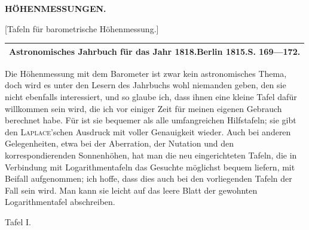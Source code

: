 \par\clearpage
\noindent{}\hfill{\small\textbf{HÖHENMESSUNGEN.}}\hfill\null\par\medskip
\vspace*{.23\textheight}
\begin{center}
[Tafeln für barometrische Höhenmessung.]
\par\bigskip
{\footnotesize
\begin{tabular}{c}
\hline
Astronomisches Jahrbuch für das Jahr 1818.\quad Berlin 1815.\quad S. 169---172.\\
\hline
\end{tabular}}
\end{center}
\par\noindent\hspace*{\parindent}Die Höhenmessung mit dem Barometer ist zwar kein astronomisches Thema,
doch wird es unter den Lesern des Jahrbuchs wohl niemanden geben, den sie nicht ebenfalls interessiert,
und so glaube ich, dass ihnen eine kleine Tafel dafür willkommen sein wird,
die ich vor einiger Zeit für meinen eigenen Gebrauch berechnet habe. Für  ist sie
bequemer als alle umfangreichen Hilfstafeln; sie gibt den
\textsc{Laplace}'schen Ausdruck mit voller Genauigkeit wieder. Auch bei anderen Gelegenheiten, etwa bei der Aberration,
der Nutation und den korrespondierenden Sonnenhöhen, hat man die neu eingerichteten Tafeln, die in Verbindung mit
Logarithmentafeln das Gesuchte möglichst bequem liefern, mit Beifall aufgenommen; ich hoffe,
dass dies auch bei den vorliegenden Tafeln der Fall sein wird. Man kann sie leicht auf
das leere Blatt der gewohnten Logarithmentafel abschreiben.
\begin{center}Tafel I.\end{center}

